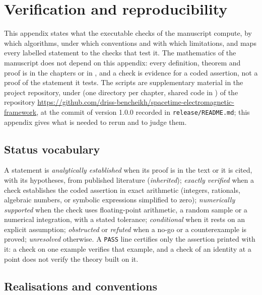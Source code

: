 \chapter{Verification and reproducibility}
\label{app:repro}

This appendix states what the executable checks of the manuscript compute, by which algorithms, under which conventions and with which
limitations, and maps every labelled statement to the checks that test it. The mathematics of the manuscript does not depend on this
appendix: every definition, theorem and proof is in the chapters or in , and a check is evidence for a
coded assertion, not a proof of the statement it tests. The scripts are supplementary material in the project repository, under  (one directory per chapter, shared code in ) of the repository \url{https://github.com/driss-bencheikh/spacetime-electromagnetic-framework}, at the commit of version 1.0.0 recorded in \texttt{release/README.md}; this appendix gives what is needed to rerun and to judge them.

\section{Status vocabulary}
\label{app:repro:status}

A statement is \emph{analytically established} when its proof is in the text or it is cited, with its hypotheses, from published
literature (\emph{inherited}); \emph{exactly verified} when a check establishes the coded assertion in exact arithmetic (integers,
rationals, algebraic numbers, or symbolic expressions simplified to zero); \emph{numerically supported} when the check uses floating-point
arithmetic, a random sample or a numerical integration, with a stated tolerance; \emph{conditional} when it rests on an explicit
assumption; \emph{obstructed} or \emph{refuted} when a no-go or a counterexample is proved; \emph{unresolved} otherwise. A \texttt{PASS} line
certifies only the assertion printed with it: a check on one example verifies that example, and a check of an identity at a point does not
verify the theory built on it.

\section{Realisations and conventions}
\label{app:repro:conv}

